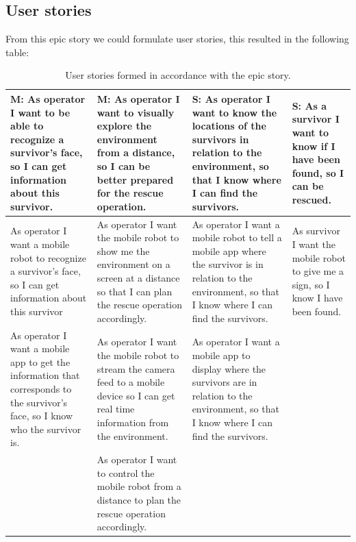 \documentclass[12pt]{article}
\begin{document}
	\subsection{User stories}
	 From this epic story we could formulate user stories, this resulted in the following table:
	 \begin{table}[H]
	 	\centering
	 	\begin{tabularx}{\linewidth}{|X|X|X|X|}
	 		\hline
	 		\textbf{M: As operator I want to be able to recognize a survivor's face, so I can get information about this survivor.}                                               &\textbf{M: As operator I want to visually explore the environment from a distance, so I can be better prepared for the rescue operation.}       &\textbf{S: As operator I want to know the locations of the survivors in relation to the environment, so that I know where I can find the survivors.}
	 		                                                        &\textbf{S: As a survivor I want to know if I have been found, so I can be rescued.}
	 		                                                                                    \tabularnewline \hline
	 		As operator I want a mobile robot to recognize a survivor's face, so I can get information about this survivor                                              &As operator I want the mobile robot to show me the environment on a screen at a distance so that I can plan the rescue operation accordingly.                                          &As operator I want a mobile robot to tell a mobile app where the survivor is in relation to the environment, so that I know where I can find the survivors.                                            &As survivor I want the mobile robot to give me a sign, so I know I have been found.
	 		\tabularnewline \hline
	 		As operator I want a mobile app to get the information that corresponds to the survivor's face, so I know who the survivor is.                                                   &As operator I want the mobile robot to stream the camera feed to a mobile device so I can get real time information from the environment.   &As operator I want a mobile app to display where the survivors are in relation to the environment, so that I know where I can find the survivors. &   \tabularnewline \hline
	 	                                               &As operator I want to control the mobile robot from a distance to plan the rescue operation accordingly.  & &
            \tabularnewline \hline
	 	\end{tabularx}
	 	\caption{User stories formed in accordance with the epic story.}
	 	\label{table:userStories}   
	 \end{table}
 	
\end{document}
